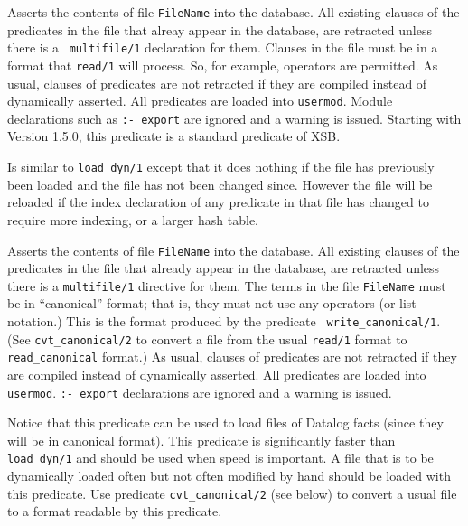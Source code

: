\begin{description}
\label{load_dyn/1}
    Asserts the contents of file {\tt FileName} into the database.
    All existing clauses of the predicates in the file that alreay
    appear in the database, are retracted unless there is a {\tt
    multifile/1} declaration for them.  Clauses in the file must be
    in a format that {\tt read/1} will process.  So, for example,
    operators are permitted.  As usual, clauses of predicates are not
    retracted if they are compiled instead of dynamically asserted.
    All predicates are loaded into {\tt usermod}.  Module declarations
    such as {\tt :- export} are ignored and a warning is issued.
    Starting with Version 1.5.0, this predicate is a standard predicate
    of XSB.

    Is similar to {\tt load\_dyn/1} except that it does nothing if the
    file has previously been loaded and the file has not been changed
    since.  However the file will be reloaded if the index declaration of
    any predicate in that file has changed to require more indexing, or a
    larger hash table.

    Asserts the contents of file {\tt FileName} into the database.
    All existing clauses of the predicates in the file that already appear
    in the database, are retracted unless there is a {\tt multifile/1}
    directive for them.  The terms in the file {\tt FileName} must be in
    ``canonical'' format; that is, they must not use any operators (or
    list notation.) This is the format produced by the predicate {\tt
    write\_canonical/1}. (See {\tt cvt\_canonical/2} to convert a file from
    the usual {\tt read/1} format to {\tt read\_canonical} format.)  As
    usual, clauses of predicates are not retracted if they are compiled
    instead of dynamically asserted. All predicates are loaded into {\tt
    usermod}.  {\tt :- export} declarations are ignored and a warning is
    issued.

    Notice that this predicate can be used to load files of Datalog facts
    (since they will be in canonical format).  This predicate is
    significantly faster than {\tt load\_dyn/1} and should be used when
    speed is important.  A file that is to be dynamically loaded often but
    not often modified by hand should be loaded with this predicate.  Use
    predicate {\tt cvt\_canonical/2} (see below) to convert a usual file
    to a format readable by this predicate.


\end{description}
